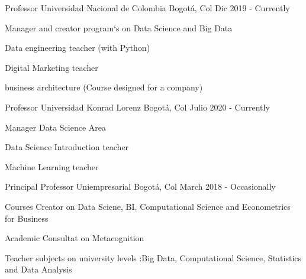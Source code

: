 

\begin{cventries}

\cventry
    {Professor}
    {Universidad Nacional de Colombia}
    {Bogotá, Col}
    {Dic 2019 - Currently}
    {
    \begin{cvitems}
    \item {Manager and creator program`s on Data Science and Big Data}
    \item {Data engineering teacher (with Python)}
    \item {Digital Marketing teacher}
    \item {business architecture (Course designed for a company)}
    \end{cvitems}
    }
 


\cventry
    {Professor}
    {Universidad Konrad Lorenz}
    {Bogotá, Col}
    {Julio 2020 - Currently}
    {
    \begin{cvitems}
    \item {Manager Data Science Area}
    \item {Data Science Introduction teacher}
    \item {Machine Learning  teacher}
    \end{cvitems}
    }


  \cventry
    {Principal Professor } %
    {Uniempresarial} %
    {Bogotá, Col} %
    {March 2018 - Occasionally} %
    {
      \begin{cvitems} %
        \item {Courses Creator on Data Sciene, BI, Computational Science and Econometrics for Business}
        \item {Academic Consultat on Metacognition }
        \item {Teacher  subjects on university levels :Big Data, Computational Science, Statistics and Data Analysis}
      \end{cvitems}
    }


\end{cventries}
